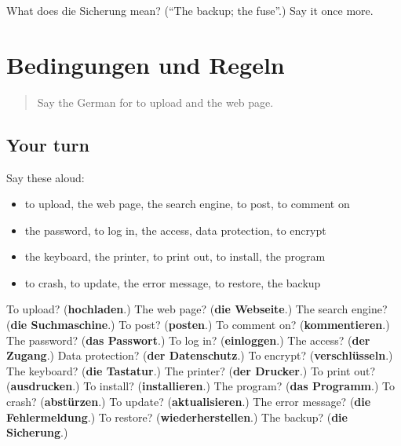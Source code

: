 \begin{tcolorbox}[breakable,colback=teal!4,colframe=teal!35!black,title={Before you move on}]
What does die Sicherung mean? (\textquotedblleft{}The backup; the fuse\textquotedblright{}.) Say it once more.
\end{tcolorbox}
\section[(dialogue)]{Bedingungen und Regeln}

\label{lesson:GE-R397-review-394-397}



\begin{quote}
Say the German for to upload and the web page.
\end{quote}

\subsection*{Your turn}
Say these aloud:

\begin{itemize}
\raggedright
  \item to upload, the web page, the search engine, to post, to comment on
  \item the password, to log in, the access, data protection, to encrypt
  \item the keyboard, the printer, to print out, to install, the program
  \item to crash, to update, the error message, to restore, the backup
\end{itemize}

\begin{tcolorbox}[breakable,colback=teal!4,colframe=teal!35!black,title={Before you move on}]
To upload? (\textbf{hochladen}.) The web page? (\textbf{die Webseite}.) The search engine? (\textbf{die Suchmaschine}.) To post? (\textbf{posten}.) To comment on? (\textbf{kommentieren}.) The password? (\textbf{das Passwort}.) To log in? (\textbf{einloggen}.) The access? (\textbf{der Zugang}.) Data protection? (\textbf{der Datenschutz}.) To encrypt? (\textbf{verschlüsseln}.) The keyboard? (\textbf{die Tastatur}.) The printer? (\textbf{der Drucker}.) To print out? (\textbf{ausdrucken}.) To install? (\textbf{installieren}.) The program? (\textbf{das Programm}.) To crash? (\textbf{abstürzen}.) To update? (\textbf{aktualisieren}.) The error message? (\textbf{die Fehlermeldung}.) To restore? (\textbf{wiederherstellen}.) The backup? (\textbf{die Sicherung}.)
\end{tcolorbox}
